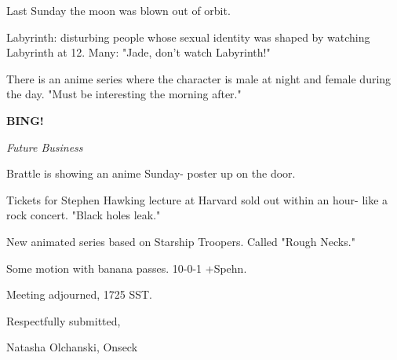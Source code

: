 \documentclass[12pt]{article}
\newcommand{\bing}{{\bf BING!} }
\newcommand{\goto}[1]{\bing \vskip 12pt \centerline{{\em{#1}}}}
\begin{document}
Last Sunday the moon was blown out of orbit.

Labyrinth: disturbing people whose sexual identity was shaped by watching Labyrinth at 12. Many: "Jade, don't watch Labyrinth!"

There is an anime series where the character is male at night and female during the day. "Must be interesting the morning after."

\goto{Future Business}

Brattle is showing an anime Sunday- poster up on the door.

Tickets for Stephen Hawking lecture at Harvard sold out within an hour- like a rock concert. "Black holes leak."

New animated series based on Starship Troopers. Called "Rough Necks."

Some motion with banana passes. 10-0-1 +Spehn.

\vspace{12pt}

\noindent
Meeting adjourned, 1725 SST.

\vspace{18pt}

\centerline{Respectfully submitted,}
\centerline{Natasha Olchanski, Onseck}
\end{document}
